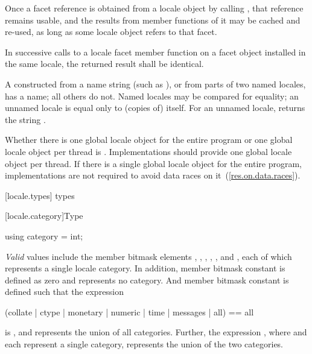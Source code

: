 \pnum
Once a facet reference is obtained from a locale object by calling
,
that reference remains usable, and the results from member functions
of it may be cached and re-used, as long as some locale object refers
to that facet.

\pnum
In successive calls to a locale facet member function on a facet object
installed in the same locale, the returned result shall be identical.

\pnum
A
constructed from a name string (such as ), or from parts of
two named locales, has a name; all others do not.
Named locales may be compared for equality; an unnamed locale is equal
only to (copies of) itself.
For an unnamed locale,
returns the string
.

\pnum
Whether there is one global locale object for the entire program or one global locale
object per thread is .
Implementations should provide one global locale object per
thread. If there is a single global locale object for the entire program,
implementations are not required to avoid data races on it~(\ref{res.on.data.races}).

[locale.types]{ types}


[locale.category]{Type }

%
%
\begin{itemdecl}
using category = int;
\end{itemdecl}

\pnum
\textit{Valid}
values include the
member bitmask elements
,
,
,
,
,
and
,
each of which represents a single locale category.
In addition,
member bitmask constant
is defined as zero and represents no category. And
member bitmask constant
is defined such that the expression

\begin{codeblock}
(collate | ctype | monetary | numeric | time | messages | all) == all
\end{codeblock}

is
,
and represents the union of all categories.
Further, the expression
,
where
and
each represent a single category, represents the union of the two categories.

